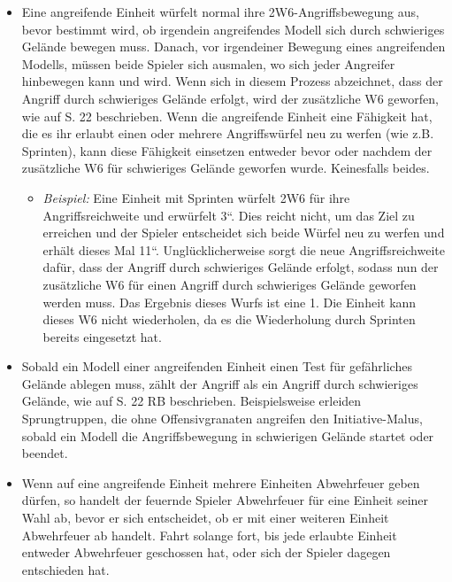 \begin{itemize}

 \item Eine angreifende Einheit würfelt normal ihre 2W6-Angriffsbewegung aus,
  bevor bestimmt wird, ob irgendein angreifendes Modell sich durch schwieriges
  Gelände bewegen muss. Danach, vor irgendeiner Bewegung eines angreifenden
  Modells, müssen beide Spieler sich ausmalen, wo sich jeder Angreifer
  hinbewegen kann und wird. Wenn sich in diesem Prozess abzeichnet, dass der
  Angriff durch schwieriges Gelände erfolgt, wird der zusätzliche W6 geworfen,
  wie auf S. 22 beschrieben.  Wenn die angreifende Einheit eine Fähigkeit hat,
  die es ihr erlaubt einen oder mehrere Angriffswürfel neu zu werfen (wie z.B.
  Sprinten), kann diese Fähigkeit einsetzen entweder bevor oder nachdem der
  zusätzliche W6 für schwieriges Gelände geworfen wurde. Keinesfalls beides.
\begin{itemize}
 \item \textit{Beispiel:} Eine Einheit mit Sprinten würfelt 2W6 für ihre
  Angriffsreichweite und erwürfelt 3“. Dies reicht nicht, um das Ziel zu
  erreichen und der Spieler entscheidet sich beide Würfel neu zu werfen und
  erhält dieses Mal 11“. Unglücklicherweise sorgt die neue Angriffsreichweite
  dafür, dass der Angriff durch schwieriges Gelände erfolgt, sodass nun der
  zusätzliche W6 für einen Angriff durch schwieriges Gelände geworfen werden
  muss. Das Ergebnis dieses Wurfs ist eine 1. Die Einheit kann dieses W6 nicht
  wiederholen, da es die Wiederholung durch Sprinten bereits eingesetzt hat.
\end{itemize}

\item Sobald ein Modell einer angreifenden Einheit einen Test für gefährliches
 Gelände ablegen muss, zählt der Angriff als ein Angriff durch schwieriges
 Gelände, wie auf S. 22 RB beschrieben. Beispielsweise erleiden Sprungtruppen,
 die ohne Offensivgranaten angreifen den Initiative-Malus, sobald ein Modell die
 Angriffsbewegung in schwierigen Gelände startet oder beendet.

\item Wenn auf eine angreifende Einheit mehrere Einheiten Abwehrfeuer geben
 dürfen, so handelt der feuernde Spieler Abwehrfeuer für eine Einheit seiner
 Wahl ab, bevor er sich entscheidet, ob er mit einer weiteren Einheit
 Abwehrfeuer ab handelt.  Fahrt solange fort, bis jede erlaubte Einheit entweder
 Abwehrfeuer geschossen hat, oder sich der Spieler dagegen entschieden hat.


\end{itemize}
